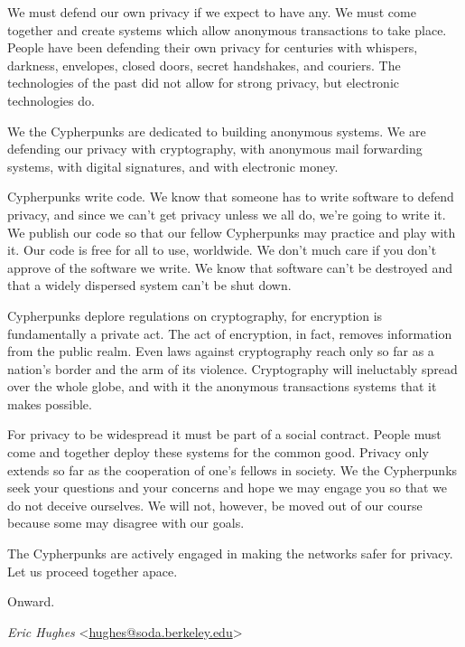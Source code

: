 \documentclass[letterpaper,12pt,english]{sphinxmanual}
\begin{document}
We must defend our own privacy if we expect to have any. We must come together and create systems which allow anonymous transactions to take place. People have been defending their own privacy for centuries with whispers, darkness, envelopes, closed doors, secret handshakes, and couriers. The technologies of the past did not allow for strong privacy, but electronic technologies do.

We the Cypherpunks are dedicated to building anonymous systems. We are defending our privacy with cryptography, with anonymous mail forwarding systems, with digital signatures, and with electronic money.

Cypherpunks write code. We know that someone has to write software to defend privacy, and since we can't get privacy unless we all do, we're going to write it. We publish our code so that our fellow Cypherpunks may practice and play with it. Our code is free for all to use, worldwide. We don't much care if you don't approve of the software we write. We know that software can't be destroyed and that a widely dispersed system can't be shut down.

Cypherpunks deplore regulations on cryptography, for encryption is fundamentally a private act. The act of encryption, in fact, removes information from the public realm. Even laws against cryptography reach only so far as a nation's border and the arm of its violence. Cryptography will ineluctably spread over the whole globe, and with it the anonymous transactions systems that it makes possible.

For privacy to be widespread it must be part of a social contract. People must come and together deploy these systems for the common good. Privacy only extends so far as the cooperation of one's fellows in society. We the Cypherpunks seek your questions and your concerns and hope we may engage you so that we do not deceive ourselves. We will not, however, be moved out of our course because some may disagree with our goals.

The Cypherpunks are actively engaged in making the networks safer for privacy. Let us proceed together apace.

Onward.

\emph{Eric Hughes} \textless{}\href{mailto:hughes@soda.berkeley.edu}{hughes@soda.berkeley.edu}\textgreater{}

\end{document}
